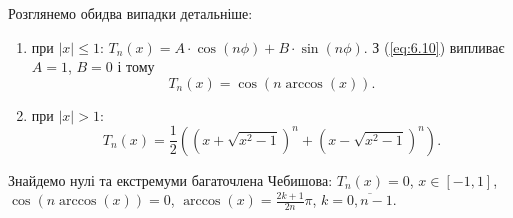 Розглянемо обидва випадки детальніше: 
\begin{enumerate}
    \item при $|x| \le 1$: $T_n(x) = A\cdot\cos(n\phi) + B\cdot\sin(n\phi)$. З (\ref{eq:6.10}) випливає $A=1$, $B=0$ і тому \begin{equation} \label{eq:6.11} T_n(x) = \cos(n \arccos (x)). \end{equation}
    \item при $|x| > 1$: \begin{equation} \label{eq:6.12} T_n(x) = \dfrac12 \left(\left(x+\sqrt{x^2-1}\right)^n+\left(x-\sqrt{x^2-1}\right)^n\right). \end{equation}
\end{enumerate}
Знайдемо нулі та екстремуми багаточлена Чебишова: $T_n(x) = 0$, $x\in[-1,1]$, $\cos(n \arccos(x)) = 0$, $\arccos(x) = \frac{2k+1}{2n}\pi$, $k=\overline{0,n-1}$. \\

